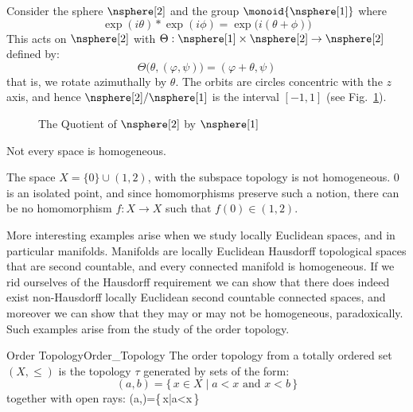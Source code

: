         \begin{example}
            Consider the sphere $\nsphere[2]$ and the group
            $\monoid{\nsphere[1]}$ where
            \begin{equation}
                \exp(i\theta)*\exp(i\phi)=\exp\big(i(\theta+\phi)\big)
            \end{equation}
            This acts on $\nsphere[2]$ with
            $\Theta:\nsphere[1]\times\nsphere[2]\rightarrow\nsphere[2]$ defined
            by:
            \begin{equation}
                \Theta\big(\theta,(\varphi,\psi)\big)=(\varphi+\theta,\psi)
            \end{equation}
            that is, we rotate azimuthally by $\theta$. The orbits are circles
            concentric with the $z$ axis, and hence $\nsphere[2]/\nsphere[1]$ is
            the interval $[\minus{1},1]$ (see Fig.~\ref{fig:Quotient_S2_by_S1}).
        \end{example}
        \begin{figure}[H]
            \centering
            \captionsetup{type=figure}
            
            \caption{The Quotient of $\nsphere[2]$ by $\nsphere[1]$}
            \label{fig:Quotient_S2_by_S1}
        \end{figure}
        Not every space is homogeneous.
        \begin{example}
            The space $X=\{0\}\cup(1,2)$, with the subspace topology is not
            homogeneous. $0$ is an isolated point, and since homomorphisms
            preserve such a notion, there can be no homomorphism
            $f:X\rightarrow{X}$ such that $f(0)\in(1,2)$.
        \end{example}
        More interesting examples arise when we study locally Euclidean spaces,
        and in particular manifolds. Manifolds are locally Euclidean Hausdorff
        topological spaces that are second countable, and every connected
        manifold is homogeneous. If we rid ourselves of the Hausdorff
        requirement we can show that there does indeed exist non-Hausdorff
        locally Euclidean second countable connected spaces, and moreover we
        can show that they may or may not be homogeneous, paradoxically. Such
        examples arise from the study of the order topology.
        \begin{fdefinition}{Order Topology}{Order_Topology}
            The order topology from a totally ordered set $(X,\leq)$ is
            the topology $\tau$ generated by sets of the form:
            \begin{equation}
                (a,b)=\{\,x\in{X}\;|\;a<x\textrm{ and }x<b\,\}
            \end{equation}
            together with open rays:
                        {(a,\infty)=\{\,x\;|\;a<x\,\}}
        \end{fdefinition}
